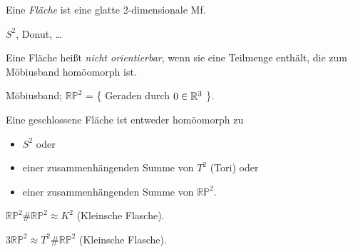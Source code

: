 \begin{defi}[Fläche]
Eine \emph{Fläche} ist eine glatte 2-dimensionale Mf.
\end{defi}

\begin{bsp}
$S^2$, Donut, \dots
\end{bsp}

\begin{defi}[Orientierbarkeit]
Eine Fläche heißt \emph{nicht orientierbar}, wenn sie eine Teilmenge enthält, die zum Möbiusband homöomorph ist.
\end{defi}

\begin{bsp}
Möbiusband; $\mathbb{RP}^2$ = \{ Geraden durch $0 \in \mathbb R^3$ \}.
\end{bsp}

\begin{satz}
Eine geschlossene Fläche ist entweder homöomorph zu
\begin{itemize}
	\item $S^2$ oder
	\item einer zusammenhängenden Summe von $T^2$ (Tori) oder
	\item einer zusammenhängenden Summe von $\mathbb{RP}^2$.
\end{itemize}
\end{satz}

\begin{lemma}
$\mathbb{RP}^2 \# \mathbb{RP}^2 \approx K^2$ (Kleinsche Flasche).
\end{lemma}

\begin{lemma}
$3 \mathbb{RP}^2 \approx T^2 \# \mathbb{RP}^2 $ (Kleinsche Flasche).
\end{lemma}